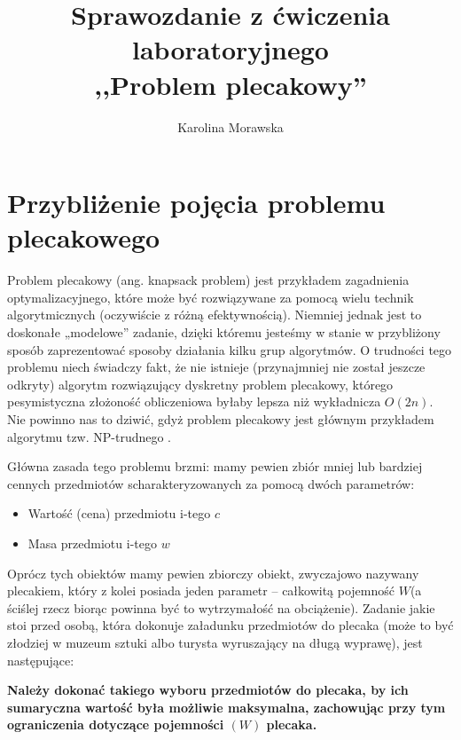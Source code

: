 \documentclass[11pt]{article}
\title{Sprawozdanie z ćwiczenia laboratoryjnego \\,,Problem plecakowy''}
\author{Karolina Morawska}
\begin{document}
\maketitle
\newpage
\tableofcontents
\newpage
\section{Przybliżenie pojęcia problemu plecakowego}
Problem plecakowy (ang. knapsack problem) jest przykładem zagadnienia optymalizacyjnego, które może być rozwiązywane za pomocą wielu technik algorytmicznych (oczywiście z różną efektywnością). Niemniej jednak jest to doskonałe „modelowe” zadanie, dzięki któremu jesteśmy w stanie w przybliżony sposób zaprezentować sposoby działania kilku grup algorytmów. O trudności tego problemu niech świadczy fakt, że nie istnieje (przynajmniej nie został jeszcze odkryty) algorytm rozwiązujący dyskretny problem plecakowy, którego pesymistyczna złożoność obliczeniowa byłaby lepsza niż wykładnicza $O(2n)$. Nie powinno nas to dziwić, gdyż problem plecakowy jest głównym przykładem algorytmu tzw. NP-trudnego .

Główna zasada tego problemu brzmi: mamy pewien zbiór mniej lub bardziej cennych przedmiotów scharakteryzowanych za pomocą dwóch parametrów:
\begin{itemize}
\item Wartość (cena) przedmiotu i-tego $c$
\item Masa przedmiotu i-tego $w$
\end{itemize}
Oprócz tych obiektów mamy pewien zbiorczy obiekt, zwyczajowo nazywany plecakiem, który z kolei posiada jeden parametr – całkowitą pojemność $W$(a ściślej rzecz biorąc powinna być to wytrzymałość na obciążenie). Zadanie jakie stoi przed osobą, która dokonuje załadunku przedmiotów do plecaka (może to być złodziej w muzeum sztuki albo turysta wyruszający na długą wyprawę), jest następujące:

\textbf{Należy dokonać takiego wyboru przedmiotów do plecaka, by ich sumaryczna wartość była możliwie maksymalna, zachowując przy tym ograniczenia dotyczące pojemności $(W)$ plecaka.}
\end{document}
